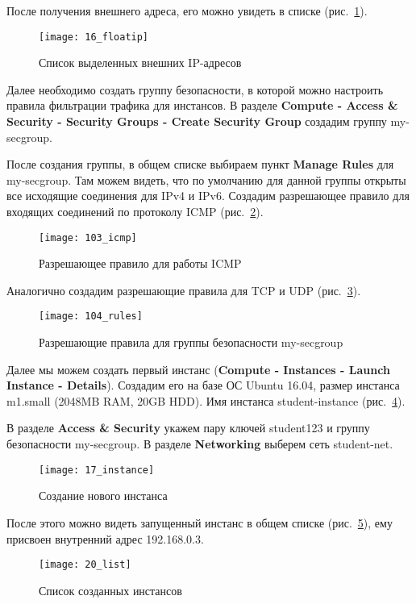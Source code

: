 После получения внешнего адреса, его можно увидеть в списке (рис.~\ref{pic:float_ip}).
\begin{figure}[ht]
    \centering
    \texttt{[image: 16\_floatip]}
    \caption{Список выделенных внешних IP-адресов}\label{pic:float_ip}
\end{figure}

Далее необходимо создать группу безопасности, в которой можно настроить правила фильтрации трафика для инстансов.
В разделе \textbf{Compute - Access \& Security - Security Groups - Create Security Group} создадим группу my-secgroup.

После создания группы, в общем списке выбираем пункт \textbf{Manage Rules} для my-secgroup.
Там можем видеть, что по умолчанию для данной группы открыты все исходящие соединения для IPv4 и IPv6.
Создадим разрешающее правило для входящих соединений по протоколу ICMP (рис.~\ref{pic:icmp}).
\begin{figure}[ht]
    \centering
    \texttt{[image: 103\_icmp]}
    \caption{Разрешающее правило для работы ICMP}\label{pic:icmp}
\end{figure}

Аналогично создадим разрешающие правила для TCP и UDP (рис.~\ref{pic:rules}).
\begin{figure}[ht]
    \centering
    \texttt{[image: 104\_rules]}
    \caption{Разрешающие правила для группы безопасности my-secgroup}\label{pic:rules}
\end{figure}

\clearpage

Далее мы можем создать первый инстанс (\textbf{Compute - Instances - Launch Instance - Details}).
Создадим его на базе ОС Ubuntu 16.04, размер инстанса m1.small (2048MB RAM, 20GB HDD).
Имя инстанса student-instance (рис.~\ref{pic:instance}).

В разделе \textbf{Access \& Security} укажем пару ключей student123 и группу безопасности my-secgroup.
В разделе \textbf{Networking} выберем сеть student-net.
\begin{figure}[ht]
    \centering
    \texttt{[image: 17\_instance]}
    \caption{Создание нового инстанса}\label{pic:instance}
\end{figure}

После этого можно видеть запущенный инстанс в общем списке (рис.~\ref{pic:list}), ему присвоен внутренний адрес 192.168.0.3.
\begin{figure}[ht]
    \centering
    \texttt{[image: 20\_list]}
    \caption{Список созданных инстансов}\label{pic:list}
\end{figure}

